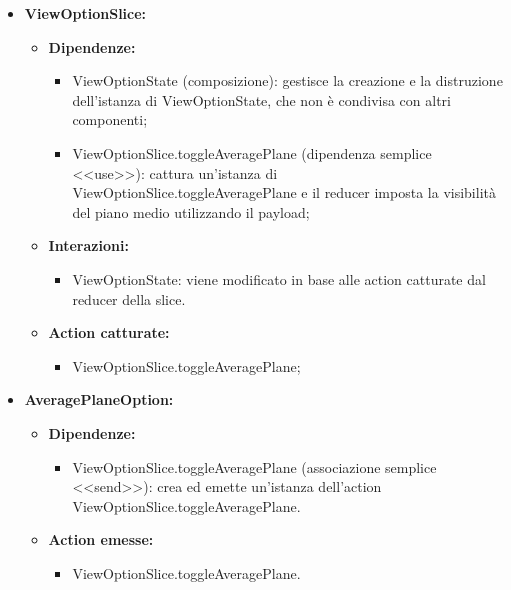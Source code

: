 \begin{itemize}
      \item \textbf{ViewOptionSlice:}
            \begin{itemize}
                  \item \textbf{Dipendenze:}
                        \begin{itemize}
                              \item ViewOptionState (composizione): gestisce la creazione e la distruzione
                                    dell'istanza di ViewOptionState, che non è condivisa con altri componenti;
                              \item ViewOptionSlice.toggleAveragePlane (dipendenza semplice <<use>>): cattura
                                    un'istanza di ViewOptionSlice.toggleAveragePlane e il reducer imposta la
                                    visibilità del piano medio utilizzando il payload;
                        \end{itemize}
                  \item \textbf{Interazioni:}
                        \begin{itemize}
                              \item ViewOptionState: viene modificato in base alle action catturate dal reducer
                                    della slice.
                        \end{itemize}
                  \item \textbf{Action catturate:}
                        \begin{itemize}
                              \item ViewOptionSlice.toggleAveragePlane;
                        \end{itemize}
            \end{itemize}

      \item \textbf{AveragePlaneOption:}
            \begin{itemize}
                  \item \textbf{Dipendenze:}
                        \begin{itemize}
                              \item ViewOptionSlice.toggleAveragePlane (associazione semplice <<send>>): crea ed
                                    emette un'istanza dell'action ViewOptionSlice.toggleAveragePlane.
                        \end{itemize}
                  \item \textbf{Action emesse:}
                        \begin{itemize}
                              \item ViewOptionSlice.toggleAveragePlane.
                        \end{itemize}
            \end{itemize}


\end{itemize}
